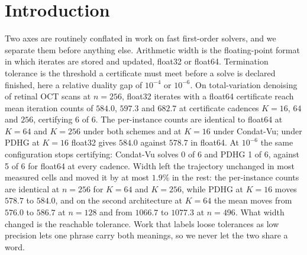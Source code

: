 
\section{Introduction}
\label{sec:intro}

Two axes are routinely conflated in work on fast first-order solvers, and we
separate them before anything else. Arithmetic width is the floating-point
format in which iterates are stored and updated, float32 or float64.
Termination tolerance is the threshold a certificate must meet before a solve
is declared finished, here a relative duality gap of $10^{-4}$ or $10^{-6}$. On
total-variation denoising of retinal OCT scans at $n=256$, float32 iterates
with a float64 certificate reach mean iteration counts of $584.0$, $597.3$ and
$682.7$ at certificate cadences $K=16$, $64$ and $256$, certifying 6 of 6. The
per-instance counts are identical to float64 at $K=64$ and $K=256$ under both
schemes and at $K=16$ under Condat-Vu; under PDHG at $K=16$ float32 gives
$584.0$ against $578.7$ in float64. At $10^{-6}$ the same configuration stops
certifying: Condat-Vu solves 0 of 6 and PDHG 1 of 6, against 5 of 6 for float64
at every cadence.
Width left the trajectory unchanged in most measured cells and moved it by at
most $1.9\%$ in the rest: the per-instance counts are identical at $n=256$ for
$K=64$ and $K=256$, while PDHG at $K=16$ moves $578.7$ to $584.0$, and on the
second architecture at $K=64$ the mean moves from $576.0$ to $586.7$ at $n=128$
and from $1066.7$ to $1077.3$ at $n=496$. What width changed is the reachable
tolerance.
Work that labels loose tolerances as low precision lets one phrase carry both
meanings, so we never let the two share a word.

